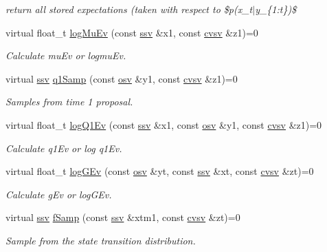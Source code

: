\begin{DoxyCompactItemize}
\begin{DoxyCompactList}\small\item\em return all stored expectations (taken with respect to \$p(x\+\_\+t$\vert$y\+\_\+\{1\+:t\})\$ \end{DoxyCompactList}\item 
virtual float\+\_\+t \hyperlink{classBSFilterWC_aa6cd7297e8e8d0beff66555e56d918d2}{log\+Mu\+Ev} (const \hyperlink{classBSFilterWC_afff292a8cc15505cc3aa244135203c78}{ssv} \&x1, const \hyperlink{classBSFilterWC_a52f5a46901a821fffe82937543220a1a}{cvsv} \&z1)=0
\begin{DoxyCompactList}\small\item\em Calculate mu\+Ev or logmu\+Ev. \end{DoxyCompactList}\item 
virtual \hyperlink{classBSFilterWC_afff292a8cc15505cc3aa244135203c78}{ssv} \hyperlink{classBSFilterWC_af6be8944fa674554f91e003b66f514ca}{q1\+Samp} (const \hyperlink{classBSFilterWC_a48b0c7f1a1cf7e57300cf820e74057ce}{osv} \&y1, const \hyperlink{classBSFilterWC_a52f5a46901a821fffe82937543220a1a}{cvsv} \&z1)=0
\begin{DoxyCompactList}\small\item\em Samples from time 1 proposal. \end{DoxyCompactList}\item 
virtual float\+\_\+t \hyperlink{classBSFilterWC_a7047659c85ddc9a9e798f8e66d5f0d2b}{log\+Q1\+Ev} (const \hyperlink{classBSFilterWC_afff292a8cc15505cc3aa244135203c78}{ssv} \&x1, const \hyperlink{classBSFilterWC_a48b0c7f1a1cf7e57300cf820e74057ce}{osv} \&y1, const \hyperlink{classBSFilterWC_a52f5a46901a821fffe82937543220a1a}{cvsv} \&z1)=0
\begin{DoxyCompactList}\small\item\em Calculate q1\+Ev or log q1\+Ev. \end{DoxyCompactList}\item 
virtual float\+\_\+t \hyperlink{classBSFilterWC_aa990c3307d1b3fd5fd980c5c770ec0be}{log\+G\+Ev} (const \hyperlink{classBSFilterWC_a48b0c7f1a1cf7e57300cf820e74057ce}{osv} \&yt, const \hyperlink{classBSFilterWC_afff292a8cc15505cc3aa244135203c78}{ssv} \&xt, const \hyperlink{classBSFilterWC_a52f5a46901a821fffe82937543220a1a}{cvsv} \&zt)=0
\begin{DoxyCompactList}\small\item\em Calculate g\+Ev or log\+G\+Ev. \end{DoxyCompactList}\item 
virtual \hyperlink{classBSFilterWC_afff292a8cc15505cc3aa244135203c78}{ssv} \hyperlink{classBSFilterWC_a8a503fa65fea50829b0223345d890a3e}{f\+Samp} (const \hyperlink{classBSFilterWC_afff292a8cc15505cc3aa244135203c78}{ssv} \&xtm1, const \hyperlink{classBSFilterWC_a52f5a46901a821fffe82937543220a1a}{cvsv} \&zt)=0
\begin{DoxyCompactList}\small\item\em Sample from the state transition distribution. \end{DoxyCompactList}\end{DoxyCompactItemize}
